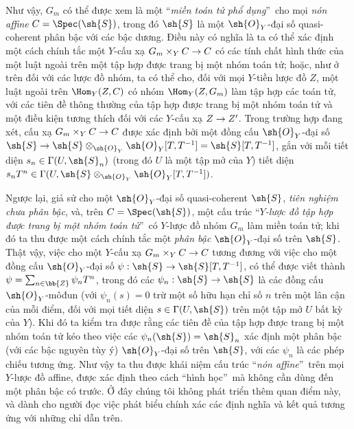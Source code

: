 \documentclass[oneside,10pt]{amsart}
\makeatletter
\newcommand{\ega@arrow}[2]{\mathchoice{#1}{#2}{#2}{#2}}
\renewcommand{\to}{\ega@arrow{\longrightarrow}{\rightarrow}}
\newcommand{\oldpage}[2][]{\marginnote{\normalfont\footnotesize\textbf{#1}~|~#2}\ignorespaces}
\makeatother
\begin{document}
\begin{remark}[8.3.9]
Như vậy, $G_m$ có thể được xem là một \textquotedblleft\emph{miền toán tử phổ dụng}\textquotedblright\ cho mọi \emph{nón affine} $C=\Spec(\sh{S})$, trong đó $\sh{S}$ là một $\sh{O}_Y$-đại số quasi-coherent phân bậc với các bậc dương.
Điều này có nghĩa là ta có thể xác định một cách chính tắc một $Y$-cấu xạ $G_m\times_Y C\to C$ có các tính chất hình thức của một luật ngoài trên một tập hợp được trang bị một nhóm toán tử;
hoặc, như ở trên đối với các lược đồ nhóm, ta có thể cho, đối với mọi $Y$-tiền lược đồ $Z$, một luật ngoài trên $\Hom_Y(Z,C)$ có nhóm $\Hom_Y(Z,G_m)$ làm tập hợp các toán tử, với các tiên đề thông thường của tập hợp được trang bị một nhóm toán tử và một điều kiện tương thích đối với các $Y$-cấu xạ $Z\to Z'$.
Trong trường hợp đang xét, cấu xạ $G_m\times_Y C\to C$ được xác định bởi một đồng cấu $\sh{O}_Y$-đại số $\sh{S} \to \sh{S}\otimes_{\sh{O}_Y}\sh{O}_Y[T,T^{-1}] = \sh{S}[T,T^{-1}]$, gắn với mỗi tiết diện $s_n\in\Gamma(U,\sh{S}_n)$ (trong đó $U$ là một tập mở của $Y$) tiết diện $s_n T^n\in\Gamma(U,\sh{S}\otimes_{\sh{O}_Y}\sh{O}_Y[T,T^{-1}])$.

Ngược lại, giả sử cho một $\sh{O}_Y$-đại số quasi-coherent $\sh{S}$, \emph{tiên nghiệm chưa phân bậc}, và, trên $C=\Spec(\sh{S})$, một cấu trúc \textquotedblleft\emph{$Y$-lược đồ tập hợp được trang bị một nhóm toán tử}\textquotedblright\ có $Y$-lược đồ nhóm $G_m$ làm miền toán tử;
khi đó ta thu được một cách chính tắc một \emph{phân bậc} $\sh{O}_Y$-đại số trên $\sh{S}$.
Thật vậy, việc cho một $Y$-cấu xạ $G_m\times_Y C\to C$ tương đương với việc cho một đồng cấu $\sh{O}_Y$-đại số $\psi:\sh{S}\to\sh{S}[T,T^{-1}]$, có thể được viết thành $\psi=\sum_{n\in\bb{Z}}\psi_n T^n$, trong đó các $\psi_n:\sh{S}\to\sh{S}$ là các đồng cấu $\sh{O}_Y$-môđun (với $\psi_n(s)=0$ trừ một số hữu hạn chỉ số $n$ trên một lân cận của mỗi điểm, đối với mọi tiết diện $s\in\Gamma(U,\sh{S})$ trên một tập mở $U$ bất kỳ của $Y$).
Khi đó ta kiểm tra được rằng các tiên đề của tập hợp được trang bị một nhóm toán tử kéo theo việc các $\psi_n(\sh{S})=\sh{S}_n$ xác định một phân bậc (với các bậc nguyên tùy ý) $\sh{O}_Y$-đại số trên $\sh{S}$, với các $\psi_n$ là các phép chiếu tương ứng.
Như vậy ta thu được khái niệm cấu trúc \textquotedblleft\emph{nón affine}\textquotedblright\ trên mọi $Y$-lược đồ affine, được xác định theo cách \textquotedblleft hình học\textquotedblright\ mà không cần dùng đến một phân bậc có trước.
\oldpage[II]{168}
Ở đây chúng tôi không phát triển thêm quan điểm này, và dành cho người đọc việc phát biểu chính xác các định nghĩa và kết quả tương ứng với những chỉ dẫn trên.
\end{remark}
\end{document}
